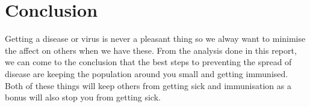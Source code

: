\documentclass{article}
\begin{document}
\section{Conclusion}
    Getting a disease or virus is never a pleasant thing so we alway want to minimise the affect on others when we have these. From the analysis done in this report, we can come to the conclusion that the best steps to preventing the spread of disease are keeping the population around you small and getting immunised. Both of these things will keep others from getting sick and immunisation as a bonus will also stop you from getting sick.
\end{document}
